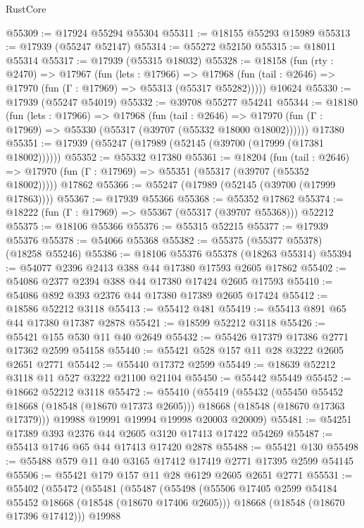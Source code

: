 \begin{lexlean}{RustCore}
\begin{coremodule}
@55309 := @17924 @55294 @55304
@55311 := @18155 @55293 @15989
@55313 := @17939 (@55247 @52147)
@55314 := @55272 @52150
@55315 := @18011 @55314
@55317 := @17939 (@55315 @18032)
@55328 := @18158
    (fun (rty : @2470) =>
    @17967
      (fun (lets : @17966) =>
      @17968 (fun (tail : @2646) => @17970 (fun (Γ : @17969) => @55313 (@55317 @55282)))))
    @10624
@55330 := @17939 (@55247 @54019)
@55332 := @39708 @55277 @54241
@55344 := @18180
    (fun (lets : @17966) =>
    @17968
      (fun (tail : @2646) =>
      @17970 (fun (Γ : @17969) => @55330 (@55317 (@39707 (@55332 @18000 @18002))))))
    @17380
@55351 := @17939 (@55247 (@17989 (@52145 (@39700 (@17999 (@17381 @18002))))))
@55352 := @55332 @17380
@55361 := @18204
    (fun (tail : @2646) => @17970 (fun (Γ : @17969) => @55351 (@55317 (@39707 (@55352 @18002)))))
    @17862
@55366 := @55247 (@17989 (@52145 (@39700 (@17999 @17863))))
@55367 := @17939 @55366
@55368 := @55352 @17862
@55374 := @18222 (fun (Γ : @17969) => @55367 (@55317 (@39707 @55368))) @52212
@55375 := @18106 @55366
@55376 := @55315 @52215
@55377 := @17939 @55376
@55378 := @54066 @55368
@55382 := @55375 (@55377 @55378) (@18258 @55246)
@55386 := @18106 @55376 @55378 (@18263 @55314)
@55394 := @54077 @2396 @2413 @388 @44 @17380 @17593 @2605 @17862
@55402 := @54086 @2377 @2394 @388 @44 @17380 @17424 @2605 @17593
@55410 := @54086 @892 @393 @2376 @44 @17380 @17389 @2605 @17424
@55412 := @18586 @52212 @3118
@55413 := @55412 @481
@55419 := @55413 @891 @65 @44 @17380 @17387 @2878
@55421 := @18599 @52212 @3118
@55426 := @55421 @155 @530 @11 @40 @2649
@55432 := @55426 @17379 @17386 @2771 @17362 @2599 @54158
@55440 := @55421 @528 @157 @11 @28 @3222 @2605 @2651 @2771
@55442 := @55440 @17372 @2599
@55449 := @18639 @52212 @3118 @11 @527 @3222 @21100 @21104
@55450 := @55442 @55449
@55452 := @18662 @52212 @3118
@55472 := @55410
    (@55419
      (@55432
        (@55450 @55452 @18668 (@18548 (@18670 @17373 @2605)))
        @18668
        (@18548 (@18670 @17363 @17379)))
      @19988
      @19991
      @19994
      @19998
      @20003
      @20009)
@55481 := @54251 @17389 @393 @2376 @44 @2605 @3120 @17413 @17422 @54269
@55487 := @55413 @1746 @65 @44 @17413 @17420 @2878
@55488 := @55421 @130
@55498 := @55488 @579 @11 @40 @3165 @17412 @17419 @2771 @17395 @2599 @54145
@55506 := @55421 @179 @157 @11 @28 @6129 @2605 @2651 @2771
@55531 := @55402
    (@55472
      (@55481
        (@55487
          (@55498
            (@55506 @17405 @2599 @54184 @55452 @18668 (@18548 (@18670 @17406 @2605)))
            @18668
            (@18548 (@18670 @17396 @17412)))
          @19988

\end{coremodule}
\end{lexlean}
